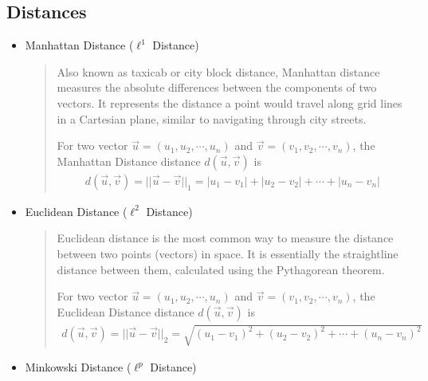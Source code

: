 \documentclass[letterpaper,11pt,english]{sphinxmanual}
\begin{document}
\subsection{Distances}
\label{\detokenize{prelim:distances}}\begin{itemize}
\item {} 
\sphinxAtStartPar
Manhattan Distance (\(\displaystyle \ell^1\) Distance)
\begin{quote}

\sphinxAtStartPar
Also known as taxicab or city block distance, Manhattan distance measures the absolute differences
between the components of two vectors. It represents the distance a point would travel along grid
lines in a Cartesian plane, similar to navigating through city streets.

\sphinxAtStartPar
For two vector \(\vec{u} = (u_1, u_2, \cdots, u_n)\) and \(\vec{v} = (v_1, v_2, \cdots, v_n)\), the
Manhattan Distance distance \(d(\vec{u},\vec{v})\) is
\begin{equation*}
\begin{split}d(\vec{u},\vec{v}) = ||\vec{u}-\vec{v}||_1 = |u_1-v_1| + |u_2-v_2|+ \cdots +|u_n-v_n|\end{split}
\end{equation*}\end{quote}

\item {} 
\sphinxAtStartPar
Euclidean Distance (\(\displaystyle \ell^2\) Distance)
\begin{quote}

\sphinxAtStartPar
Euclidean distance is the most common way to measure the distance between two points (vectors) in space.
It is essentially the straight\sphinxhyphen{}line distance between them, calculated using the Pythagorean theorem.

\sphinxAtStartPar
For two vector \(\vec{u} = (u_1, u_2, \cdots, u_n)\) and \(\vec{v} = (v_1, v_2, \cdots, v_n)\), the
Euclidean Distance distance \(d(\vec{u},\vec{v})\) is
\begin{equation*}
\begin{split}d(\vec{u},\vec{v}) = ||\vec{u}-\vec{v}||_2 = \sqrt{(u_1-v_1)^2 + (u_2-v_2)^2+ \cdots +(u_n-v_n)^2}\end{split}
\end{equation*}\end{quote}

\item {} 
\sphinxAtStartPar
Minkowski Distance (\(\displaystyle \ell^p\) Distance)
\begin{quote}


\end{quote}
\end{itemize}
\end{document}
